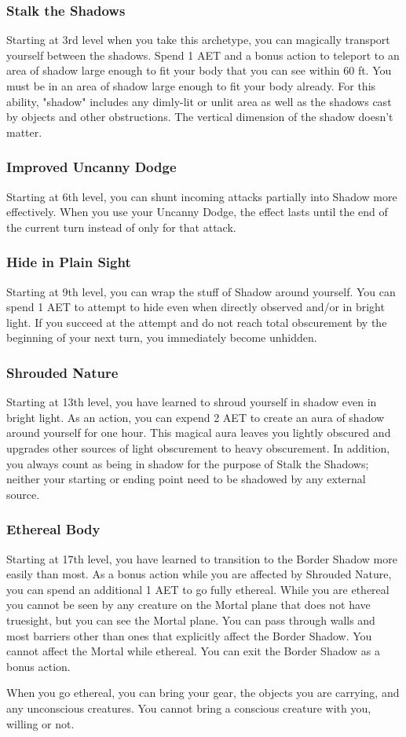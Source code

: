 \subsubsection{Stalk the Shadows}
Starting at 3rd level when you take this archetype, you can magically transport yourself between the shadows. Spend 1 AET and a bonus action to teleport to an area of shadow large enough to fit your body that you can see within 60 ft. You must be in an area of shadow large enough to fit your body already. For this ability, "shadow" includes any dimly-lit or unlit area as well as the shadows cast by objects and other obstructions. The vertical dimension of the shadow doesn't matter.

\subsubsection{Improved Uncanny Dodge}
Starting at 6th level, you can shunt incoming attacks partially into Shadow more effectively. When you use your Uncanny Dodge, the effect lasts until the end of the current turn instead of only for that attack.

\subsubsection{Hide in Plain Sight}
Starting at 9th level, you can wrap the stuff of Shadow around yourself. You can spend 1 AET to attempt to hide even when directly observed and/or in bright light. If you succeed at the attempt and do not reach total obscurement by the beginning of your next turn, you immediately become unhidden.

\subsubsection{Shrouded Nature}
Starting at 13th level, you have learned to shroud yourself in shadow even in bright light. As an action, you can expend 2 AET to create an aura of shadow around yourself for one hour. This magical aura leaves you lightly obscured and upgrades other sources of light obscurement to heavy obscurement. In addition, you always count as being in shadow for the purpose of Stalk the Shadows; neither your starting or ending point need to be shadowed by any external source.  

\subsubsection{Ethereal Body}
Starting at 17th level, you have learned to transition to the Border Shadow more easily than most. As a bonus action while you are affected by Shrouded Nature, you can spend an additional 1 AET to go fully ethereal. While you are ethereal you cannot be seen by any creature on the Mortal plane that does not have truesight, but you can see the Mortal plane. You can pass through walls and most barriers other than ones that explicitly affect the Border Shadow. You cannot affect the Mortal while ethereal. You can exit the Border Shadow as a bonus action.

When you go ethereal, you can bring your gear, the objects you are carrying, and any unconscious creatures. You cannot bring a conscious creature with you, willing or not.